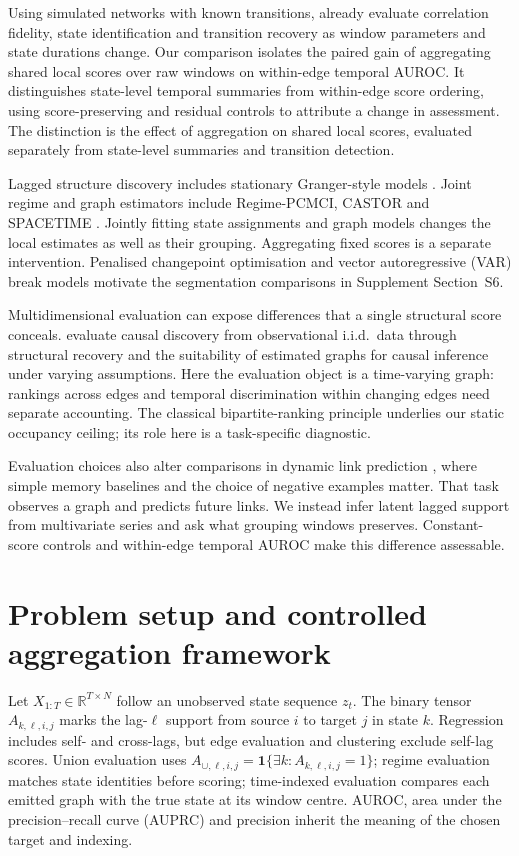 \documentclass[11pt]{article}
\begin{document}
Using simulated networks with known transitions, \citet{shakil2016evaluation}
already evaluate correlation fidelity, state identification and transition
recovery as window parameters and state durations change. Our comparison
isolates the paired gain of aggregating shared local scores over raw windows
on within-edge temporal AUROC. It distinguishes state-level temporal
summaries from within-edge score ordering, using score-preserving and
residual controls to attribute a change in assessment. The distinction is the effect of aggregation on shared local scores,
evaluated separately from state-level summaries and transition detection.

Lagged structure discovery includes stationary Granger-style models
\citep{granger1969investigating,runge2019detecting}. Joint regime and graph
estimators include Regime-PCMCI, CASTOR and SPACETIME
\citep{saggioro2020regime,rahmani2025castor,mameche2025spacetime}.
Jointly fitting state assignments and graph models changes the local estimates
as well as their grouping. Aggregating fixed scores is a separate intervention.
Penalised changepoint optimisation \citep{killick2012optimal} and vector
autoregressive (VAR) break models \citep{bai1998estimating} motivate the
segmentation comparisons in Supplement Section~S6.

Multidimensional evaluation can expose differences that a single structural
score conceals. \citet{velev2026evaluation} evaluate causal discovery from
observational i.i.d.\ data through structural recovery and the suitability of
estimated graphs for causal inference under varying assumptions. Here the
evaluation object is a time-varying graph: rankings across edges and temporal
discrimination within changing edges need separate accounting. The classical
bipartite-ranking principle \citep{clemencon2008ranking} underlies our static
occupancy ceiling; its role here is a task-specific diagnostic.

Evaluation choices also alter comparisons in dynamic link prediction
\citep{poursafaei2022towards}, where simple memory baselines and the choice of
negative examples matter. That task observes a graph and predicts future links.
We instead infer latent lagged support from multivariate series and ask what
grouping windows preserves. Constant-score controls and within-edge temporal AUROC
make this difference assessable.

\section{Problem setup and controlled aggregation framework}
\label{sec:framework}
Let $X_{1:T}\in\mathbb R^{T\times N}$ follow an unobserved state sequence $z_t$.
The binary tensor $A_{k,\ell,i,j}$ marks the lag-$\ell$ support from source $i$
to target $j$ in state $k$. Regression includes self- and cross-lags, but edge
evaluation and clustering exclude self-lag scores. Union evaluation uses
$A_{\cup,\ell,i,j}=\mathbf1\{\exists k:A_{k,\ell,i,j}=1\}$; regime evaluation
matches state identities before scoring; time-indexed evaluation compares each
emitted graph with the true state at its window centre. AUROC, area under the
precision--recall curve (AUPRC) and precision inherit the meaning of the chosen
target and indexing.
\end{document}
